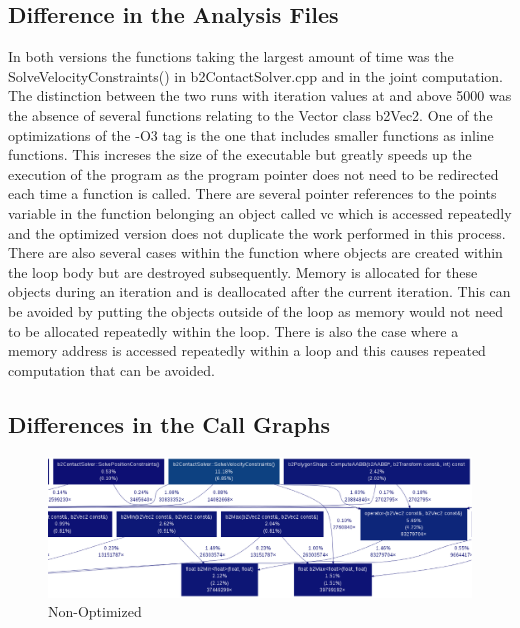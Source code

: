 \documentclass[11pt] {article}
\begin{document}
\subsection{Difference in the Analysis Files}

In both versions the functions taking the largest amount of time was the SolveVelocityConstraints() in
b2ContactSolver.cpp and in the joint computation. The distinction between the two runs with iteration values at and above 5000 was
the absence of several functions relating to the Vector class b2Vec2. One of the optimizations of 
the -O3 tag is the one that includes smaller functions as inline functions. This increses the size of
the executable but greatly speeds up the execution of the program as the program pointer does not need
to be redirected each time a function is called. There are several pointer references to the points 
variable in the function belonging an object called vc which is accessed repeatedly and the
optimized version does not duplicate the work performed in this process. There are also several cases
within the function where objects are created within the loop body but are destroyed subsequently.
Memory is allocated for these objects during an iteration and is deallocated after the current 
iteration. This can be avoided by putting the objects outside of the loop as memory would not need
to be allocated repeatedly within the loop. There is also the case where a memory address is accessed
repeatedly within a loop and this causes repeated computation that can be avoided.

\subsection{Differences in the Call Graphs}

\begin {figure} [ht]
\begin {center}
\includegraphics[scale = 0.4] {debugProfile.eps}
\end {center}
\caption {Non-Optimized}
\end {figure}
\end{document}
